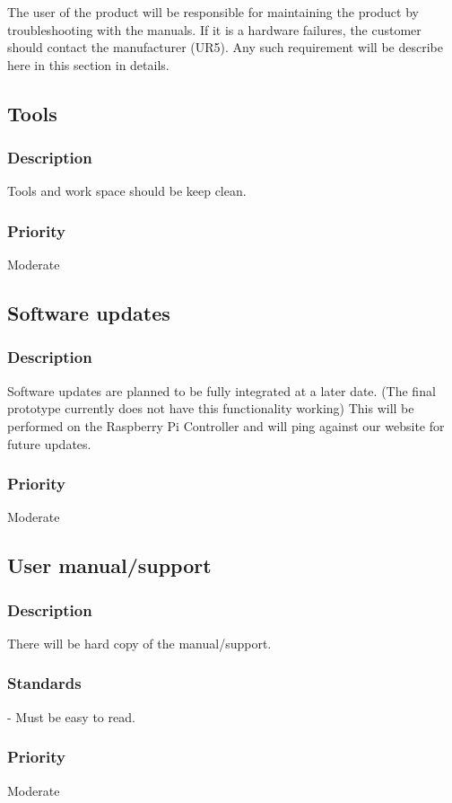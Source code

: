 The user of the product will be responsible for maintaining the product by troubleshooting with the manuals. If it is a hardware failures, the customer should contact the manufacturer (UR5). Any such requirement will be describe here in this section in details.

\subsection{Tools}
\subsubsection{Description}
Tools and work space should be keep clean.
\subsubsection{Priority}
Moderate

\subsection{Software updates}
\subsubsection{Description}
Software updates are planned to be fully integrated at a later date. (The final prototype currently does not have this functionality working) This will be performed on the Raspberry Pi Controller and will ping against our website for future updates.
\subsubsection{Priority}
Moderate

\subsection{User manual/support}
\subsubsection{Description}
There will be hard copy of the manual/support.

\subsubsection{Standards}
- Must be easy to read. 
\subsubsection{Priority}
Moderate